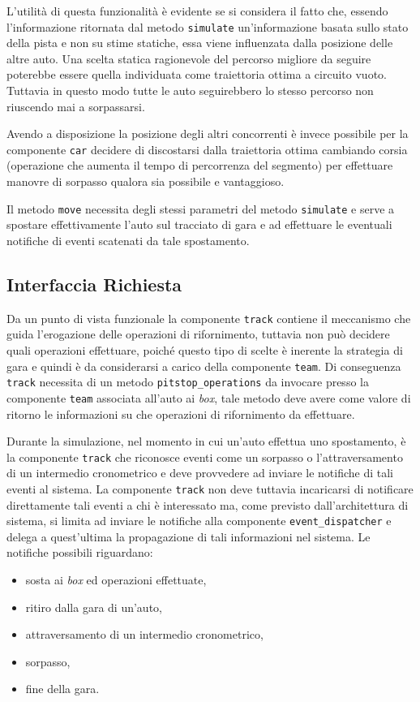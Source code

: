 \documentclass[a4paper]{report}
\newcommand{\fun}[1]{\texttt{#1}}
\begin{document}
L'utilità di questa funzionalità è evidente se si considera il fatto che, essendo l'informazione ritornata dal metodo \fun{simulate} un'informazione basata sullo stato della pista e non su stime statiche, essa viene influenzata dalla posizione delle altre auto. Una scelta statica ragionevole del percorso migliore da seguire poterebbe essere quella individuata come traiettoria ottima a circuito vuoto. Tuttavia in questo modo tutte le auto seguirebbero lo stesso percorso non riuscendo mai a sorpassarsi.

Avendo a disposizione la posizione degli altri concorrenti è invece possibile per la componente \texttt{car} decidere di discostarsi dalla traiettoria ottima cambiando corsia (operazione che aumenta il tempo di percorrenza del segmento) per effettuare manovre di sorpasso qualora sia possibile e vantaggioso.

Il metodo \fun{move} necessita degli stessi parametri del metodo \fun{simulate} e serve a spostare effettivamente l'auto sul tracciato di gara e ad effettuare le eventuali notifiche di eventi scatenati da tale spostamento.

\subsection*{Interfaccia Richiesta}
Da un punto di vista funzionale la componente \texttt{track} contiene il meccanismo che guida l'erogazione delle operazioni di rifornimento, tuttavia non può decidere quali operazioni effettuare, poiché questo tipo di scelte è inerente la strategia di gara e quindi è da considerarsi a carico della componente \texttt{team}. Di conseguenza \texttt{track} necessita di un metodo \fun{pitstop\_operations} da invocare presso la componente \texttt{team} associata all'auto ai \textit{box}, tale metodo deve avere come valore di ritorno le informazioni su che operazioni di rifornimento da effettuare.

Durante la simulazione, nel momento in cui un'auto effettua uno spostamento, è la componente \texttt{track} che riconosce eventi come un sorpasso o l'attraversamento di un intermedio cronometrico e deve provvedere ad inviare le notifiche di tali eventi al sistema. La componente \texttt{track} non deve tuttavia incaricarsi di notificare direttamente tali eventi a chi è interessato ma, come previsto dall'architettura di sistema, si limita ad inviare le notifiche alla componente \texttt{event\_dispatcher} e delega a quest'ultima la propagazione di tali informazioni nel sistema.
Le notifiche possibili riguardano:
\begin{itemize}
\item sosta ai \textit{box} ed operazioni effettuate,
\item ritiro dalla gara di un'auto,
\item attraversamento di un intermedio cronometrico,
\item sorpasso,
\item fine della gara.
\end{itemize}
\end{document}
